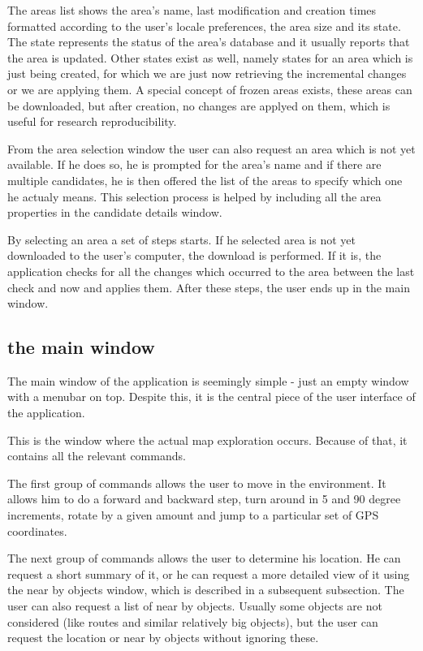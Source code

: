 \documentclass[nolof,digital]{fithesis3}
\begin{document}
The areas list shows the area's name, last modification and creation times formatted according to the user's locale preferences, the area size and its state. The state represents the status of the area's database and it usually reports that the area is updated. Other states exist as well, namely states for an area which is just being created, for which we are just now retrieving the incremental changes or we are applying them. A special concept of frozen areas exists, these areas can be downloaded, but after creation, no changes are applyed on them, which is useful for research reproducibility.

From the area selection window the user can also request an area which is not yet available. If he does so, he is prompted for the area's name and if there are multiple candidates, he is then offered the list of the areas to specify which one he actualy means. This selection process is helped by including all the area properties in the candidate details window.

By selecting an area a set of steps starts. If he selected area is not yet downloaded to the user's computer, the download is performed. If it is, the application checks for all the changes which occurred to the area between the last check and now and applies them. After these steps, the user ends up in the main window.
\subsection{the main window}
The main window of the application is seemingly simple - just an empty window with a menubar on top. Despite this, it is the central piece of the user interface of the application.

This is the window where the actual map exploration occurs. Because of that, it contains all the relevant commands.

The first group of commands allows the user to move in the environment. It allows him to do a forward and backward step, turn around in 5 and 90 degree increments, rotate by a given amount and jump to a particular set of GPS coordinates.

The next group of commands allows the user to determine his location. He can request a short summary of it, or he can request a more detailed view of it using the near by objects window, which is described in a subsequent subsection. The user can also request a list of near by objects. Usually some objects are not considered (like routes and similar relatively big objects), but the user can request the location or near by objects without ignoring these.
\end{document}
